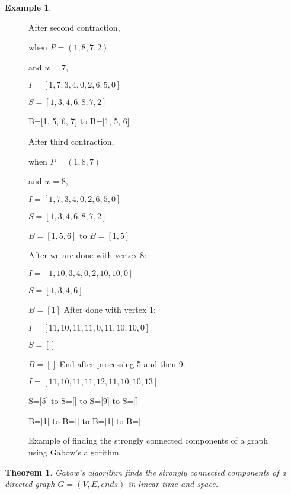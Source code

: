 \documentclass{report}
\theoremstyle{plain}
\newtheorem{theorem}{Theorem}
\theoremstyle{definition}
\newtheorem{example}{Example}
\theoremstyle{remark}
\numberwithin{definition}{chapter}
\numberwithin{example}{chapter}
\numberwithin{figure}{chapter}
\numberwithin{theorem}{chapter}
\numberwithin{lemma}{chapter}
\begin{document}
\begin{example}
\begin{figure}[h]
After second contraction,

when $P=(1,8,7,2)$

and $w=7$,

$I=[1, 7, 3, 4, 0, 2, 6, 5, 0]$

$S=[1, 3, 4, 6, 8, 7, 2]$

B=[1, 5, 6, 7] to B=[1, 5, 6]
\endminipage\hfill
{}

After third contraction,

when $P=(1,8,7)$

and $w=8$,

$I=[1, 7, 3, 4, 0, 2, 6, 5, 0]$

$S=[1, 3, 4, 6, 8, 7, 2]$

$B=[1, 5, 6]$ to $B=[1, 5]$
\endminipage\hfill

\vspace*{2\baselineskip}

After we are done with vertex 8:

$I=[1, 10, 3, 4, 0, 2, 10, 10, 0]$

$S=[1, 3, 4, 6]$

$B=[1]$
\endminipage\hfill
{}
After done with vertex 1:

$I=[11, 10, 11, 11, 0, 11, 10, 10, 0]$

$S=[]$

$B=[]$
\endminipage\hfill
{}
End after processing 5 and then 9:

$I=[11, 10, 11, 11, 12, 11, 10, 10, 13]$

S=[5] to S=[] to S=[9] to S=[]

B=[1] to B=[] to B=[1] to B=[]
\endminipage\hfill


\caption{Example of finding the strongly connected components of a graph using Gabow's algorithm}
\end{figure}
\end{example}

\begin{theorem}
Gabow's algorithm finds the strongly connected components of a directed graph $G=(V,E,ends)$ in linear time and space.
\end{theorem}
\end{document}
